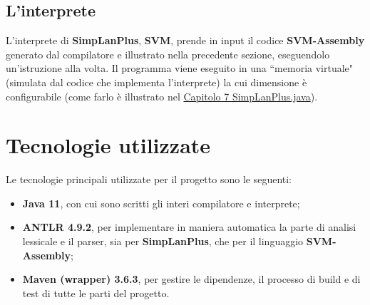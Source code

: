 \documentclass[../report.tex]{subfiles}
\begin{document}
\subsection{L'interprete}\label{ss:interprete}
L'interprete di \textbf{SimpLanPlus}, \textbf{SVM}, prende in input il codice \textbf{SVM-Assembly} generato dal compilatore e illustrato nella precedente sezione, eseguendolo un'istruzione alla volta.
Il programma viene eseguito in una ``memoria virtuale" (simulata dal codice che implementa l'interprete) la cui dimensione è configurabile (come farlo è illustrato nel \hyperref[c:simplanplus-java]{Capitolo 7 SimpLanPlus.java}).

\section{Tecnologie utilizzate}\label{s:teconologie-utilizzate}
Le tecnologie principali utilizzate per il progetto sono le seguenti:
\begin{itemize}
    \item \textbf{Java 11}, con cui sono scritti gli interi compilatore e interprete;
    \item \textbf{ANTLR 4.9.2}, per implementare in maniera automatica la parte di analisi lessicale e il parser, sia per \textbf{SimpLanPlus}, che per il linguaggio \textbf{SVM-Assembly};
    \item \textbf{Maven (wrapper) 3.6.3}, per gestire le dipendenze, il processo di build e di test di tutte le parti del progetto.
\end{itemize}
\end{document}

